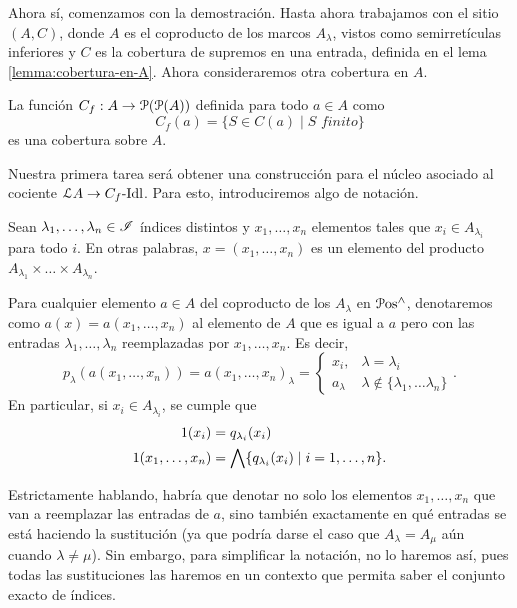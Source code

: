 Ahora sí, comenzamos con la demostración. 
Hasta ahora trabajamos con el sitio $(A,C)$, donde
$A$ es el coproducto de los marcos $A_\lambda$, vistos como
semirretículas inferiores y $C$ es la cobertura de supremos en una
entrada, definida en el lema \ref{lemma:cobertura-en-A}.
Ahora consideraremos otra cobertura en $A$.
\begin{lemma}
  La función $C_f:A\to\cal P(\cal P(A))$
  definida para todo $a\in A$ como
  \[C_f(a)=\{S\in C(a) \mid S\textit{ finito}\}\]
  es una cobertura sobre $A$.
\end{lemma}

Nuestra primera tarea será obtener una construcción para
el núcleo asociado al cociente $\cal LA\to C_f\Idl$.
Para esto, introduciremos algo de notación.

\begin{definition}
Sean $\lambda_1,\dots,\lambda_n\in \scr I$ índices distintos y
$x_1,\dots,x_n$ elementos tales que
$x_i\in A_{\lambda_i}$ para todo $i$.
En otras palabras, $x=(x_1,\dots,x_n)$ es un elemento del producto
$A_{\lambda_1}\times\dots\times A_{\lambda_n}$.

Para cualquier elemento $a\in A$ del coproducto de los $A_\lambda$
en $\Pos^{\inf}$, denotaremos como
$a(x)=a(x_1,\dots,x_n)$ al elemento de $A$ que
es igual a $a$ pero con las entradas $\lambda_1,\dots,\lambda_n$
reemplazadas por $x_1,\dots,x_n$.
Es decir,
\[
    p_\lambda(a(x_1,\dots,x_n))
    =
    a(x_1,\dots,x_n)_\lambda
    =
    \begin{cases}
        x_i, & \lambda = \lambda_i \\
        a_\lambda & \lambda\not\in\{\lambda_1,\dots\lambda_n\}
    \end{cases}
.\]
En particular, si $x_i\in A_{\lambda_i}$, se cumple que
\begin{align*}
  1(x_i)
    &= q_{\lambda_i}(x_i) \\
  1(x_1,\dots,x_n)
    &= \Inf\{q_{\lambda_i}(x_i) \mid i=1,\dots,n\}.
\end{align*}

Estrictamente hablando,
habría que denotar no solo los elementos $x_1,\dots,x_n$
que van a reemplazar las
entradas de $a$, sino también exactamente en qué entradas se
está haciendo la sustitución
(ya que podría darse el caso que $A_\lambda=A_\mu$ aún cuando
$\lambda\neq\mu$).
Sin embargo, para simplificar la notación, no lo haremos así, pues todas las
sustituciones las haremos en un contexto que permita saber
el conjunto exacto de índices.
\end{definition}

